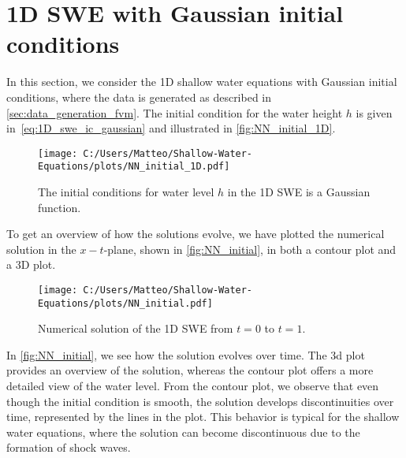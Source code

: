 \section{1D SWE with Gaussian initial conditions}
In this section, we consider the 1D shallow water equations with Gaussian initial conditions, where the data is generated as described in \autoref{sec:data_generation_fvm}.
The initial condition for the water height $h$ is given in~\eqref{eq:1D_swe_ic_gaussian} and illustrated in \autoref{fig:NN_initial_1D}.
\begin{figure}[H]
    \centering
    \texttt{[image: C:/Users/Matteo/Shallow-Water-Equations/plots/NN\_initial\_1D.pdf]}
    \caption{The initial conditions for water level $h$ in the 1D SWE is a Gaussian function.}\label{fig:NN_initial_1D}
\end{figure}
To get an overview of how the solutions evolve, we have plotted the numerical solution in the $x-t$-plane, shown in \autoref{fig:NN_initial}, in both a contour plot and a 3D plot.
\begin{figure}[H]
    \hspace{3cm} %
    \texttt{[image: C:/Users/Matteo/Shallow-Water-Equations/plots/NN\_initial.pdf]}
    \caption{Numerical solution of the 1D SWE from $t = 0$ to $t = 1$.}\label{fig:NN_initial}
\end{figure}
In \autoref{fig:NN_initial}, we see how the solution evolves over time.
The 3d plot provides an overview of the solution, whereas the contour plot offers a more detailed view of the water level.
From the contour plot, we observe that even though the initial condition is smooth, the solution develops discontinuities over time, represented by the lines in the plot.
This behavior is typical for the shallow water equations, where the solution can become discontinuous due to the formation of shock waves.

